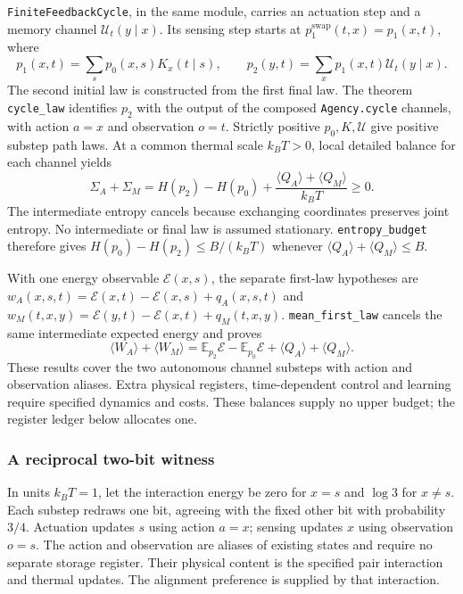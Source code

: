 \documentclass{article}
\begin{document}
\texttt{FiniteFeedbackCycle}, in the same module, carries an actuation step and a memory channel $\mathcal{U}_t(y\mid x)$. Its sensing step starts at $p_1^{\mathrm{swap}}(t,x)=p_1(x,t)$, where
\begin{equation}
 p_1(x,t)=\sum_s p_0(x,s)K_x(t\mid s),\qquad
 p_2(y,t)=\sum_x p_1(x,t)\mathcal{U}_t(y\mid x).
\end{equation}
The second initial law is constructed from the first final law. The theorem
\texttt{cycle\_law} identifies $p_2$ with the output of the composed
\texttt{Agency.cycle} channels, with action $a=x$ and observation $o=t$.
Strictly positive $p_0,K,\mathcal{U}$ give positive substep path laws. At a common
thermal scale $k_BT>0$, local detailed balance for each channel yields
\begin{equation}
 \Sigma_A+\Sigma_M
 =H(p_2)-H(p_0)+\frac{\langle Q_A\rangle+\langle Q_M\rangle}{k_BT}\ge0.
 \label{eq:finite-update-balance}
\end{equation}
The intermediate entropy cancels because exchanging coordinates preserves
joint entropy. No intermediate or final law is assumed stationary.
\texttt{entropy\_budget} therefore gives
$H(p_0)-H(p_2)\le B/(k_BT)$ whenever
$\langle Q_A\rangle+\langle Q_M\rangle\le B$.

With one energy observable $\mathcal{E}(x,s)$, the separate first-law hypotheses are
$w_A(x,s,t)=\mathcal{E}(x,t)-\mathcal{E}(x,s)+q_A(x,s,t)$ and
$w_M(t,x,y)=\mathcal{E}(y,t)-\mathcal{E}(x,t)+q_M(t,x,y)$.
\texttt{mean\_first\_law} cancels the same intermediate expected energy and proves
\begin{equation}
 \langle W_A\rangle+\langle W_M\rangle
 =\mathbb E_{p_2}\mathcal{E}-\mathbb E_{p_0}\mathcal{E}
   +\langle Q_A\rangle+\langle Q_M\rangle.
\end{equation}
These results cover the two autonomous channel substeps with action and
observation aliases. Extra physical registers, time-dependent control and
learning require specified dynamics and costs. These balances supply no upper
budget; the register ledger below allocates one.

\subsubsection{A reciprocal two-bit witness}
\label{sec:supp-reciprocal}

In units $k_BT=1$, let the interaction energy be zero for $x=s$ and $\log3$ for $x\ne s$. Each substep redraws one bit, agreeing with the fixed other bit with probability $3/4$. Actuation updates $s$ using action $a=x$; sensing updates $x$ using observation $o=s$. The action and observation are aliases of existing states and require no separate storage register. Their physical content is the specified pair interaction and thermal updates. The alignment preference is supplied by that interaction.
\end{document}
